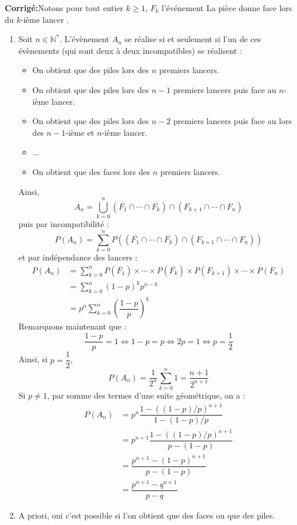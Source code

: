 \documentclass[a4paper,twoside,french,10pt]{VcCours}
\newcommand{\corr}{\textbf{Corrigé:}}
\begin{document}
\corr Notons pour tout entier $k \geq 1$, $F_k$ l'événement \og La pièce donne face lors du $k$-ième lancer \fg .

\begin{enumerate}
\item Soit $n \in \mathbb{N}^*$. L'évènement $A_n$ se réalise si et seulement si l'un de ces évènements (qui sont deux à deux incompatibles) se réalisent :
\begin{itemize}
\item On obtient que des piles lors des $n$ premiers lancers.
\item On obtient que des piles lors des $n-1$ premiers lancers puis face au $n$-ième lancer.
\item On obtient que des piles lors des $n-2$ premiers lancers puis face au lors des $n-1$-ième et $n$-ième lancer.
\item $\ldots$
\item On obtient que des faces lors des $n$ premiers lancers.
\end{itemize}
Ainsi,
$$ A_n =\bigcup_{k=0}^n (\overline{F_1} \cap \cdots \cap \overline{F_k}) \cap (F_{k+1} \cap \cdots \cap F_n)$$
puis par incompatibilité :
$$ P(A_n) = \sum_{k=0}^n P( (\overline{F_1} \cap \cdots \cap \overline{F_k}) \cap (F_{k+1} \cap \cdots \cap F_n))$$
et par indépendance des lancers :
\begin{align*}
 P(A_n) & = \sum_{k=0}^n P(\overline{F_1}) \times \cdots \times P(\overline{F_k}) \times P(F_{k+1}) \times \cdots \times P( F_n) \\
 & = \sum_{k=0}^n  (1-p)^k p^{n-k} \\
 & = p^{n} \sum_{k=0}^n \left( \dfrac{1-p}{p} \right)^k 
 \end{align*}
Remarquons maintenant que :
$$\dfrac{1-p}{p} = 1 \Longleftrightarrow 1-p=p \Longleftrightarrow 2p=1 \Longleftrightarrow p = \dfrac{1}{2}$$
Ainsi, si $p = \dfrac{1}{2}$,
$$ P(A_n) = \dfrac{1}{2^{n}} \sum_{k=0}^n 1 = \dfrac{n+1}{2^{n+1}}$$
Si $p \neq 1$, par somme des termes d'une suite géométrique, on a :
\begin{align*}
P(A_n) & = p^n \dfrac{1-((1-p)/p)^{n+1}}{1-(1-p)/p} \\
& = p^{n+1} \dfrac{1-((1-p)/p)^{n+1}}{p-(1-p)} \\
& = \dfrac{p^{n+1}-(1-p)^{n+1}}{p-(1-p)} \\
& = \dfrac{p^{n+1}-q^{n+1}}{p-q}
\end{align*}
\item A priori, oui c'est possible si l'on obtient que des faces ou que des piles. 




\end{enumerate}
\end{document}
